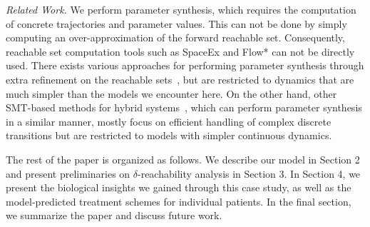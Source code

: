 \noindent \textit{Related Work.} 
We perform parameter synthesis, which requires the computation of
concrete trajectories and parameter values. This can not be done by
simply computing an over-approximation of the forward reachable set.
Consequently, reachable set computation tools such as SpaceEx \cite{spaceex} and
Flow* \cite{flowstar} can not be directly used. There exists various approaches for
performing parameter synthesis through extra refinement on the
reachable sets~\cite{DreossiD14,BogomolovMPW14,FrehseJK08},
but are restricted to dynamics that are much simpler than the models
we encounter here. On the other hand, other SMT-based methods for
hybrid systems~\cite{CimattiGMT13,CimattiMT12},
which can perform parameter synthesis in a similar manner, mostly
focus on efficient handling of complex discrete transitions but are
restricted to models with simpler continuous dynamics.


%
%
%
%


The rest of the paper is organized as follows. We describe our model in Section 2 and present preliminaries on $\delta$-reachability analysis in Section 3. In Section 4, we present the biological insights we gained through this case study, as well as the model-predicted treatment schemes for individual patients. In the final section, we summarize the paper and discuss future work.
